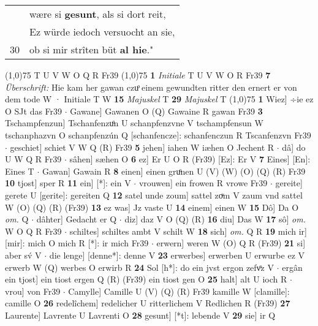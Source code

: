 \documentclass[8pt,a4paper,notitlepage]{article}
\begin{document}
\begin{table}[ht]
\begin{minipage}[t]{0.5\linewidth}
\begin{tabular}{rl}
 & wære si \textbf{gesunt}, als si dort reit,\\ 
 & Ez würde iedoch versuocht an sie,\\ 
30 & ob si mir strîten büt \textbf{al hie}."\\ 
\end{tabular}
\scriptsize
\line(1,0){75} \newline
T U V W O Q R Fr39 \newline
\line(1,0){75} \newline
\textbf{1} \textit{Initiale} T U V W O R Fr39  \textbf{7} \textit{Überschrift:} Hie kam her gawan czuͦ einem gewundten ritter den ernert er von dem tode W  · Initiale T W  \textbf{15} \textit{Majuskel} T  \textbf{29} \textit{Majuskel} T  \newline
\line(1,0){75} \newline
\textbf{1} Wiez] ÷ie ez O SJt das Fr39  $\cdot$ Gawane] Gawanen O (Q) Gawaine R gawan Fr39 \textbf{3} Tschampfenzun] Tschanfenzuͦn U schanpfenzvne V tschampfensun W tschanphazvn O schanpfenzún Q [schanfencze]: schanfenczun R Tscanfenzvn Fr39  $\cdot$ geschiet] schiet V W Q (R) Fr39 \textbf{5} jehen] iahen W iæhen O Jechent R  $\cdot$ dâ] do U W Q R Fr39  $\cdot$ sâhen] sæhen O \textbf{6} ez] Er U O R (Fr39) [Ez]: Er  V \textbf{7} Eines] [En]: Eines T  $\cdot$ Gawan] Gawain R \textbf{8} einen] einen gruͦnen U (V) (W) (O) (Q) (R) Fr39 \textbf{10} tjost] sper R \textbf{11} ein] [*]: ein V  $\cdot$ vrouwen] ein frowen R vrowe Fr39  $\cdot$ gereite] gerete U [gerite]: gereiten Q \textbf{12} satel unde zoum] sattel zoͮm V zaum vnd sattel W (O) (Q) (R) (Fr39) \textbf{13} ez was] Jz vaste U \textbf{14} einem] einen W \textbf{15} Dô] Da O \textit{om.} Q  $\cdot$ dâhter] Gedacht er Q  $\cdot$ diz] daz V O (Q) (R) \textbf{16} diu] Das W \textbf{17} sô] \textit{om.} W O Q R Fr39  $\cdot$ schiltes] schiltes ambt V schilt W \textbf{18} sich] \textit{om.} Q R \textbf{19} mich ir] [mir]: mich O mich R [*]: ir mich Fr39  $\cdot$ erwern] weren W (O) Q R (Fr39) \textbf{21} si] aber sv́ V  $\cdot$ die lenge] [denne*]: denne V \textbf{23} erwerbes] erwerben U erwurbe ez V erwerb W (Q) werbes O erwirb R \textbf{24} Sol [h*]: do ein jvst ergon zefvͦz V  $\cdot$ ergân ein tjost] ein tiost ergen Q (R) (Fr39) ein tiost gen O \textbf{25} halt] alt U ioch R  $\cdot$ vrou] von Fr39  $\cdot$ Camylle] Camille U (V) (Q) (R) Fr39 kamille W [clamille]: camille O \textbf{26} redelîchem] redelicher U ritterlichem V Redlichen R (Fr39) \textbf{27} Laurente] Lavrente U Lavrenti O \textbf{28} gesunt] [*t]: lebende V \textbf{29} sie] ir Q \newline
\end{minipage}
\end{table}
\end{document}
